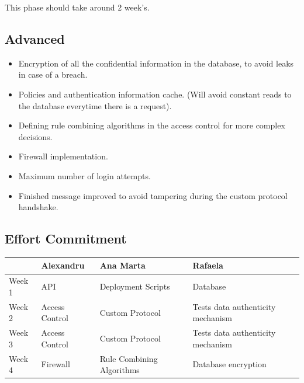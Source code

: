 This phase should take around 2 week's.


\subsection{Advanced}
\begin{itemize}
	\item Encryption of all the confidential information in the database, to avoid leaks in case of a breach.
	\item Policies and authentication information cache. (Will avoid constant reads to the database everytime there is a request).
	\item Defining rule combining algorithms in the access control for  more complex decisions.
	\item Firewall implementation.
	\item Maximum number of login attempts.
	\item Finished message improved to avoid tampering during the custom protocol handshake.
\end{itemize}


\subsection{Effort Commitment}

\begin{tabularx}{0.8\textwidth} { 
  | >{\centering\arraybackslash}X 
  | >{\centering\arraybackslash}X 
  | >{\centering\arraybackslash}X 
  | >{\centering\arraybackslash}X | }
 \hline
  & Alexandru & Ana Marta & Rafaela \\
 \hline
 Week 1  & API & Deployment Scripts & Database \\
  \hline
  Week 2  & Access Control  & Custom Protocol & Tests data authenticity mechanism \\
   \hline
   Week 3  & Access Control  & Custom Protocol  & Tests data authenticity mechanism \\
    \hline
    Week 4  & Firewall  & Rule Combining Algorithms  & Database encryption \\
\hline
\end{tabularx}


